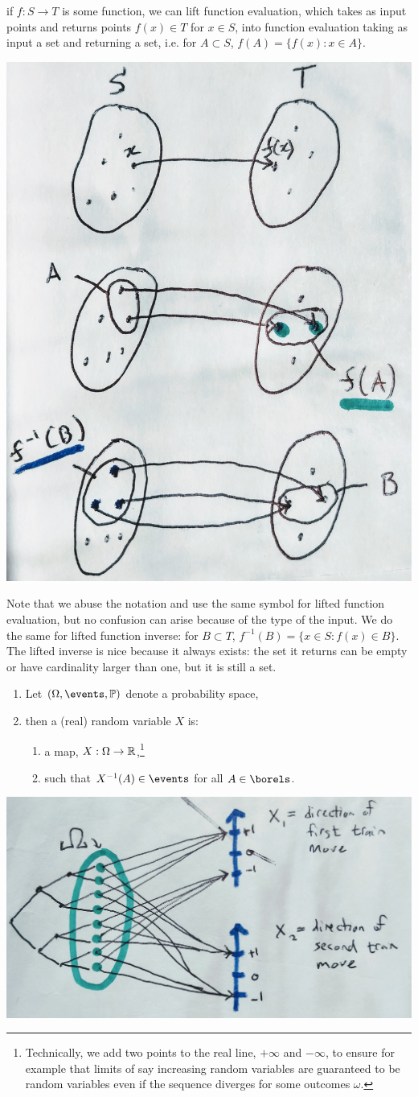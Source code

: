 \documentclass{article}
\begin{document}
 if $f : S \to T$ is some function, we can lift function evaluation, which takes as input points and returns points $f(x) \in T$ for $x \in S$, into function evaluation taking as input a set and returning a set, i.e. for $A \subset S$, $f(A) = \{f(x) : x \in A\}$. 
\begin{center}
	\includegraphics[width=0.3\linewidth]{figures/maps}
\end{center}
Note that we abuse the notation and use the same symbol for lifted function evaluation, but no confusion can arise because of the type of the input. We do the same for lifted function inverse: for $B \subset T$, $f^{-1}(B) = \{x \in S : f(x) \in B\}$. The lifted inverse is nice because it always exists: the set it returns can be empty or have cardinality larger than one, but it is still a set.

\begin{enumerate}
  \item Let $(\Omega, \events, \P)$ denote a probability space,
  \item then a (real) random variable $X$ is:
  \begin{enumerate}
    \item a map, $X : \Omega \to {\mathbb R}$,\footnote{Technically, we add two points to the real line, $+\infty$ and $-\infty$, to ensure for example that limits of say increasing random variables are guaranteed to be random variables even if the sequence diverges for some outcomes $\omega$.} 
    \item \label{rv:condition} such that $X^{-1}(A) \in \events$ for all $A \in \borels$.
  \end{enumerate}
\end{enumerate}
\begin{center}
	\includegraphics[width=0.6\linewidth]{figures/rvs}
\end{center}
\end{document}
